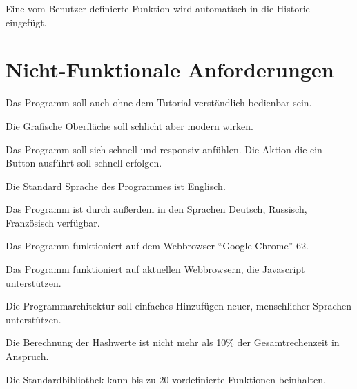 \documentclass[parskip=full,11pt,twoside]{scrartcl}
\begin{document}
Eine vom Benutzer definierte Funktion wird automatisch in die Historie eingefügt.




\section{Nicht-Funktionale Anforderungen}

Das Programm soll auch ohne dem Tutorial verständlich bedienbar sein.

Die Grafische Oberfläche soll schlicht aber modern wirken. 

Das Programm soll sich schnell und responsiv anfühlen. Die Aktion die ein Button ausführt soll schnell erfolgen. 

Die Standard Sprache des Programmes ist Englisch.

Das Programm ist durch außerdem in den Sprachen Deutsch, Russisch, Französisch verfügbar.

Das Programm funktioniert auf dem Webbrowser \enquote{Google Chrome} 62.

Das Programm funktioniert auf aktuellen Webbrowsern, die Javascript unterstützen.

Die Programmarchitektur soll einfaches Hinzufügen neuer, menschlicher Sprachen unterstützen.

Die Berechnung der Hashwerte ist nicht mehr als 10\% der Gesamtrechenzeit in Anspruch.

Die Standardbibliothek kann bis zu 20 vordefinierte Funktionen beinhalten.
\end{document}
